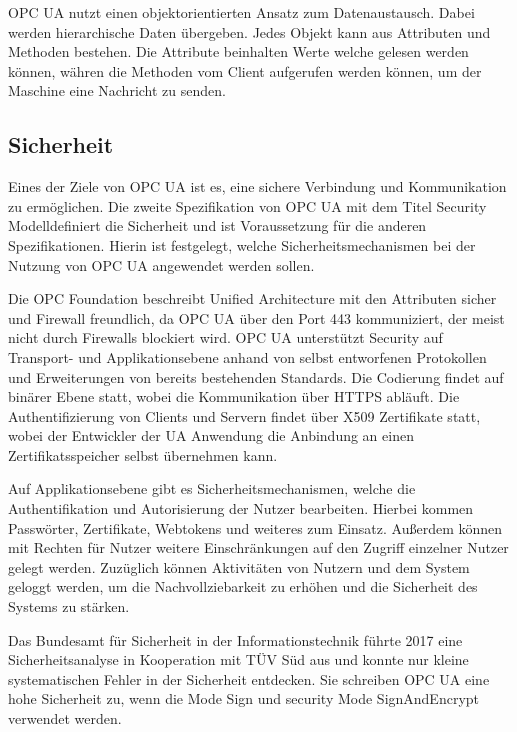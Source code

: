 \documentclass[a4paper, 12pt, oneside, toc=listofnumbered, bibliography=totoc]{scrbook}
\begin{document}
		OPC UA nutzt einen objektorientierten Ansatz zum Datenaustausch. Dabei werden hierarchische Daten übergeben. Jedes Objekt kann aus Attributen und Methoden bestehen. Die Attribute beinhalten Werte welche gelesen werden können, währen die Methoden vom Client aufgerufen werden können, um der Maschine eine Nachricht zu senden. 
		
		\subsection{Sicherheit}
		
		Eines der Ziele von OPC UA ist es, eine sichere Verbindung und Kommunikation zu ermöglichen. Die zweite Spezifikation von OPC UA mit dem Titel \glqq Security Modell\grqq definiert die Sicherheit und ist Voraussetzung für die anderen Spezifikationen. Hierin ist festgelegt, welche Sicherheitsmechanismen bei der Nutzung von OPC UA angewendet werden sollen.
		
		Die OPC Foundation beschreibt Unified Architecture mit den Attributen sicher und Firewall freundlich, da OPC UA über den Port 443 kommuniziert, der meist nicht durch Firewalls blockiert wird. OPC UA unterstützt Security auf Transport- und Applikationsebene anhand von selbst entworfenen Protokollen und Erweiterungen von bereits bestehenden Standards. Die Codierung findet auf binärer Ebene statt, wobei die Kommunikation über HTTPS abläuft. Die Authentifizierung von Clients und Servern findet über X509 Zertifikate statt, wobei der Entwickler der UA Anwendung die Anbindung an einen Zertifikatsspeicher selbst übernehmen kann. \cite{noauthor_unified_nodate, noauthor_opc_nodate}
		
		Auf Applikationsebene gibt es Sicherheitsmechanismen, welche die Authentifikation und Autorisierung der Nutzer bearbeiten. Hierbei kommen Passwörter, Zertifikate, Webtokens und weiteres zum Einsatz. Außerdem können mit Rechten für Nutzer weitere Einschränkungen auf den Zugriff einzelner Nutzer gelegt werden. Zuzüglich können Aktivitäten von Nutzern und dem System geloggt werden, um die Nachvollziebarkeit zu erhöhen und die Sicherheit des Systems zu stärken. \cite{noauthor_unified_nodate, noauthor_opc_nodate}
		
		Das Bundesamt für Sicherheit in der Informationstechnik führte 2017 eine Sicherheitsanalyse in Kooperation mit TÜV Süd aus und konnte nur kleine systematischen Fehler in der Sicherheit entdecken. Sie schreiben OPC UA eine hohe Sicherheit zu, wenn die  Mode Sign und security Mode SignAndEncrypt verwendet werden. \cite{damm_opc_2017}
		
\end{document}
